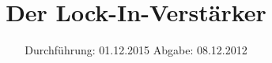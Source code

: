 

\subject{303}
\title{Der Lock-In-Verstärker}
\date{
  Durchführung: 01.12.2015
  \hspace{3em}
  Abgabe: 08.12.2012
}



\maketitle
\thispagestyle{empty}
\tableofcontents
\newpage






\printbibliography



